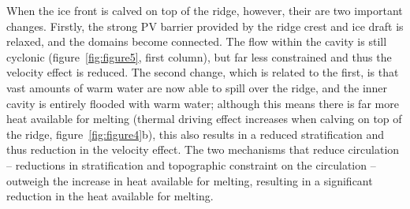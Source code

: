 \documentclass[draft]{agujournal2019}
\begin{document}
When the ice front is calved on top of the ridge, however, their are two important changes. Firstly, the strong PV barrier provided by the ridge crest and ice draft is relaxed, and the domains become connected. The flow within the cavity is still cyclonic (figure~\ref{fig:figure5}, first column), but far less constrained and thus the velocity effect is reduced. The second change, which is related to the first, is that vast amounts of warm water are now able to spill over the ridge, and the inner cavity is entirely flooded with warm water; although this means there is far more heat available for melting (thermal driving effect increases when calving on top of the ridge, figure~\ref{fig:figure4}b), this also results in a reduced stratification and thus reduction in the velocity effect. The two mechanisms that reduce circulation -- reductions in stratification and topographic constraint on the circulation -- outweigh the increase in heat available for melting, resulting in a significant reduction in the heat available for melting.


\end{document}
